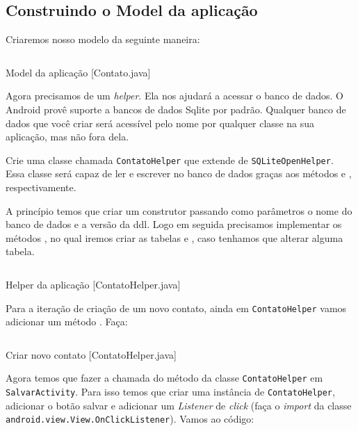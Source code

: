 \subsection{Construindo o Model da aplicação}

Criaremos nosso modelo da seguinte maneira:

\begin{listing}[H]
  \inputminted[linenos=true,frame=bottomline,tabsize=3]{ java }{ source/Contato-1.java }
  \caption{Model da aplicação [Contato.java]}
\end{listing}

Agora precisamos de um \textit{helper}. Ela nos ajudará a acessar o banco de dados. O Android provê suporte
a bancos de dados Sqlite por padrão. Qualquer banco de dados que você criar será acessível pelo nome
por qualquer classe na sua aplicação, mas não fora dela.

Crie uma classe chamada \texttt{ContatoHelper} que extende de \texttt{SQLiteOpenHelper}. Essa classe será
capaz de ler e escrever no banco de dados graças aos métodos  e
, respectivamente.

A princípio temos que criar um construtor passando como parâmetros o nome do banco de dados e a versão
da \gls{ddl}. Logo em seguida precisamos implementar os métodos , no qual iremos
criar as tabelas e , caso tenhamos que alterar alguma tabela.

\begin{listing}[H]
  \inputminted[linenos=true,frame=bottomline,tabsize=3]{ java }{ source/ContatoHelper-1.java }
  \caption{Helper da aplicação [ContatoHelper.java]}
\end{listing}

Para a iteração de criação de um novo contato, ainda em \texttt{ContatoHelper} vamos adicionar um método
. Faça:

\begin{listing}[H]
  \inputminted[linenos=true,frame=bottomline,tabsize=3]{ java }{ source/ContatoHelper-2.java }
  \caption{Criar novo contato [ContatoHelper.java]}
\end{listing}

Agora temos que fazer a chamada do método  da classe \texttt{ContatoHelper} em
\texttt{SalvarActivity}. Para isso temos que criar uma instância de \texttt{ContatoHelper}, adicionar
o botão salvar e adicionar um \textit{Listener} de \textit{click} (faça o \textit{import}
da classe\\ \texttt{android.view.View.OnClickListener}). Vamos ao código:

